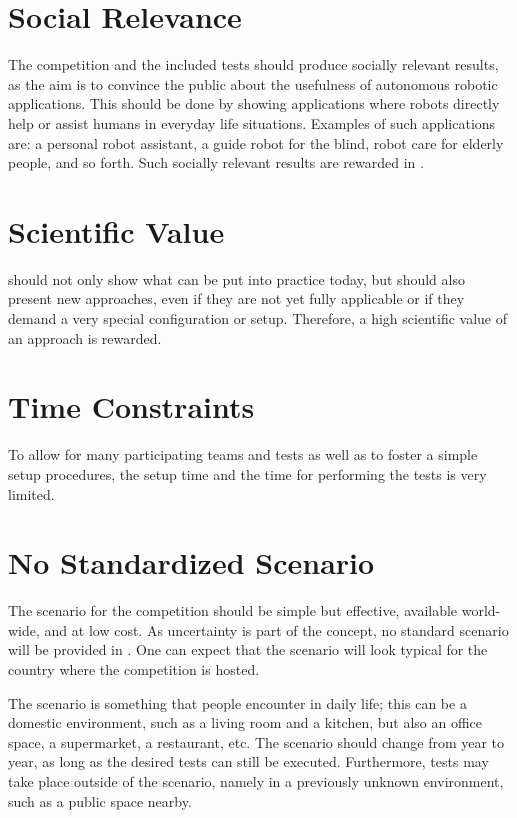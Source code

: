 \section{Social Relevance}
\label{concept:social_relevance}

The competition and the included tests should produce socially relevant results, as the aim is to convince the public about the usefulness of autonomous robotic applications.
This should be done by showing applications where robots directly help or assist humans in everyday life situations.
Examples of such applications are: a personal robot assistant, a guide robot for the blind, robot care for elderly people, and so forth.
Such socially relevant results are rewarded in \AtHome.

\section{Scientific Value}
\label{concept:scientific_value}

\AtHome{} should not only show what can be put into practice today, but should also present new approaches, even if they are not yet fully applicable or if they demand a very special configuration or setup.
Therefore, a high scientific value of an approach is rewarded.

\section{Time Constraints}
\label{concept:time_constraints}

To allow for many participating teams and tests as well as to foster a simple setup procedures, the setup time and the time for performing the tests is very limited.

\section{No Standardized Scenario}
\label{concept:no_standardized_scenario}

The scenario for the competition should be simple but effective, available world-wide, and at low cost.
As uncertainty is part of the concept, no standard scenario will be provided in \AtHome.
One can expect that the scenario will look typical for the country where the competition is hosted.

The scenario is something that people encounter in daily life; this can be a domestic environment, such as a living room and a kitchen, but also an office space, a supermarket, a restaurant, etc.
The scenario should change from year to year, as long as the desired tests can still be executed.
Furthermore, tests may take place outside of the scenario, namely in a previously unknown environment, such as a public space nearby.

